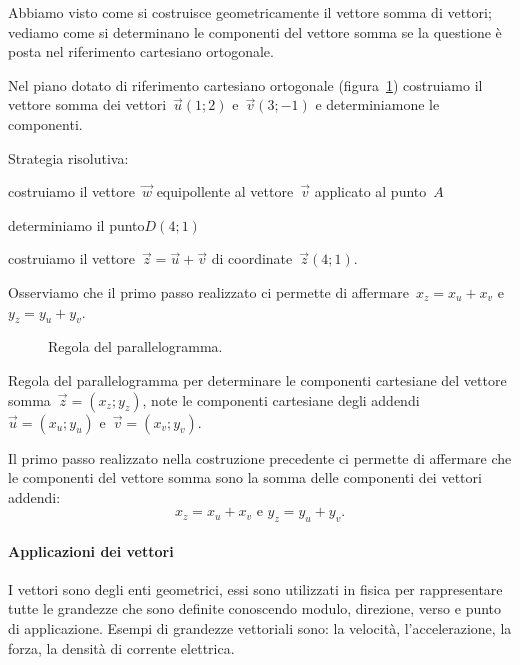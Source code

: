 Abbiamo visto come si costruisce geometricamente il vettore somma di vettori; 
vediamo come si determinano le componenti del vettore somma se la questione
è posta nel riferimento cartesiano ortogonale.

\begin{esempio}
Nel piano dotato di riferimento cartesiano ortogonale (figura~\ref{fig:F.10}) 
costruiamo il vettore somma dei vettori~$\vec{u}(1;2)$ e~$\vec{v}(3;-1)$ e 
determiniamone
le componenti.

Strategia risolutiva:
\begin{enumeratea}
\item costruiamo il vettore~$\vec{w}$ equipollente al vettore~$\vec{v}$ 
applicato al punto~$A$
\item determiniamo il punto$D(4;1)$
\item costruiamo il vettore~$\vec{z}=\vec{u}+\vec{v}$ di 
coordinate~$\vec{z}(4;1)$.
\end{enumeratea}
Osserviamo che il primo passo realizzato ci permette di 
affermare~$x_z=x_u+x_v$ 
e~$y_z=y_u+y_v$.
\end{esempio}


\begin{inaccessibleblock}
 \begin{figure}[t]
\centering

\caption{Regola del parallelogramma.}\label{fig:F.10}
\end{figure}
\end{inaccessibleblock}

\begin{procedura} Regola del parallelogramma per determinare le componenti 
cartesiane del vettore somma~$\vec{z}=(x_z;y_z)$,
note le componenti cartesiane degli addendi~$\vec{u}=(x_u;y_u)$ 
e~$\vec{v}=(x_v;y_v)$.

Il primo passo realizzato nella costruzione precedente ci permette di 
affermare 
che le componenti del vettore somma sono la somma
delle componenti dei vettori addendi:\[x_z=x_u+x_v\text{ e }y_z=y_u+y_v.\]
\end{procedura}


\paragraph{Applicazioni dei vettori}
I vettori sono degli enti geometrici, essi sono utilizzati in fisica per 
rappresentare tutte le grandezze che sono definite conoscendo modulo, 
direzione,
verso e punto di applicazione. Esempi di grandezze vettoriali sono: la 
velocità, l'accelerazione, la forza, la densità di corrente elettrica.

